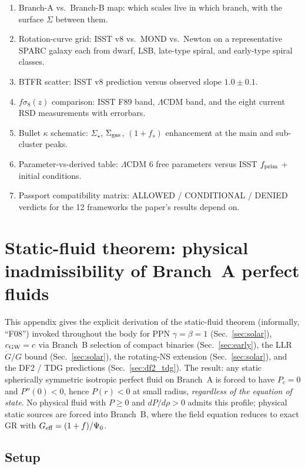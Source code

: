 \documentclass[aps,prd,twocolumn,nofootinbib,floatfix,superscriptaddress]{revtex4-2}
\newcommand{\fprim}{f_{\rm prim}}
\begin{document}
\begin{enumerate}
\item Branch-A vs.\ Branch-B map: which scales live in which branch,
with the surface $\Sigma$ between them.
\item Rotation-curve grid: ISST v8 vs.\ MOND vs.\ Newton on a
representative SPARC galaxy each from dwarf, LSB, late-type spiral,
and early-type spiral classes.
\item BTFR scatter: ISST v8 prediction versus observed slope $1.0\pm 0.1$.
\item $f\sigma_8(z)$ comparison: ISST F89 band, $\Lambda$CDM band,
and the eight current RSD measurements with errorbars.
\item Bullet $\kappa$ schematic: $\Sigma_\star$, $\Sigma_{\rm gas}$,
$(1+f_s)$ enhancement at the main and sub-cluster peaks.
\item Parameter-vs-derived table: $\Lambda$CDM 6 free parameters
versus ISST $\fprim$ + initial conditions.
\item Passport compatibility matrix: ALLOWED / CONDITIONAL / DENIED
verdicts for the 12 frameworks the paper's results depend on.
\end{enumerate}

\section{Static-fluid theorem: physical inadmissibility of Branch~A perfect fluids}
\label{app:static_fluid_theorem}

This appendix gives the explicit derivation of the static-fluid
theorem (informally, ``F08'') invoked throughout the body for PPN
$\gamma=\beta=1$ (Sec.~\ref{sec:solar}), $c_{\rm GW}=c$ via Branch~B
selection of compact binaries (Sec.~\ref{sec:early}), the LLR
$\dot G/G$ bound (Sec.~\ref{sec:solar}), the rotating-NS extension
(Sec.~\ref{sec:solar}), and the DF2 / TDG predictions
(Sec.~\ref{sec:df2_tdg}). The result: any static spherically
symmetric isotropic perfect fluid on Branch~A is forced to have
$P_c=0$ and $P''(0)<0$, hence $P(r)<0$ at small radius,
\emph{regardless of the equation of state}. No physical fluid with
$P\geq 0$ and $dP/d\rho>0$ admits this profile; physical static
sources are forced into Branch~B, where the field equation reduces
to exact GR with $G_{\rm eff}=(1+f)/\Psi_0$.

\subsection{Setup}
\end{document}
